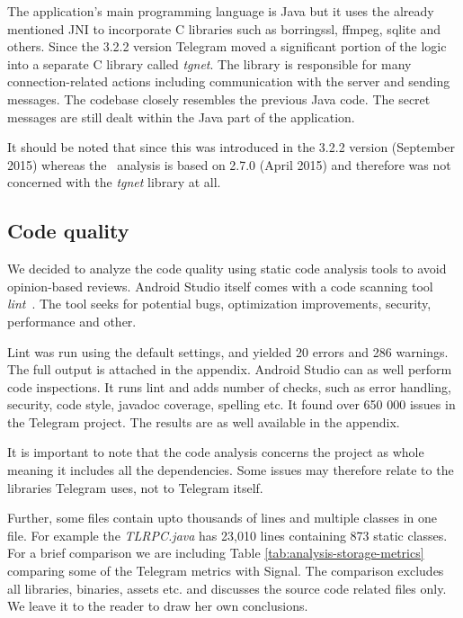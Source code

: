 \documentclass[thesis=M,english]{FITthesis}[2012/10/20]
\begin{document}
The application's main programming language is Java but it uses the already mentioned JNI to incorporate C libraries such as borringssl, ffmpeg, sqlite and others. Since the 3.2.2 version Telegram moved a significant portion of the logic into a separate C library called \emph{tgnet}. The library is responsible for many connection-related actions including communication with the server and sending messages. The codebase closely resembles the previous Java code. The secret messages are still dealt within the Java part of the application.

It should be noted that since this was introduced in the 3.2.2 version (September 2015) whereas the~\cite{telegram-aarhus} analysis is based on 2.7.0 (April 2015) and therefore was not concerned with the \emph{tgnet} library at all.

\subsection{Code quality}

We decided to analyze the code quality using static code analysis tools to avoid opinion-based reviews. Android Studio itself comes with a code scanning tool \emph{lint}~\cite{android-studio-lint}. The tool seeks for potential bugs, optimization improvements, security, performance and other.

Lint was run using the default settings, and yielded 20 errors and 286 warnings. The full output is attached in the appendix. Android Studio can as well perform code inspections. It runs lint and adds number of checks, such as error handling, security, code style, javadoc coverage, spelling etc. It found over 650 000 issues in the Telegram project. The results are as well available in the appendix. %

It is important to note that the code analysis concerns the project as whole meaning it includes all the dependencies. Some issues may therefore relate to the libraries Telegram uses, not to Telegram itself.

Further, some files contain upto thousands of lines and multiple classes in one file. For example the \emph{TLRPC.java} has 23,010 lines containing 873 static classes. For a brief comparison we are including Table \ref{tab:analysis-storage-metrics} comparing some of the Telegram metrics with Signal. The comparison excludes all libraries, binaries, assets etc. and discusses the source code related files only. We leave it to the reader to draw her own conclusions.
\end{document}
